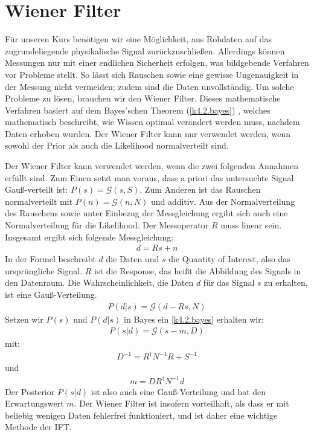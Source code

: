 \section{Wiener Filter}\label{k4.2.wiener.filter}

Für unseren Kurs benötigen wir eine Möglichkeit, aus Rohdaten auf das zugrundeliegende physikalische Signal zurückzuschließen. Allerdings können Messungen nur mit einer endlichen Sicherheit erfolgen, was bildgebende Verfahren vor Probleme stellt. So lässt sich Rauschen sowie eine gewisse Ungenauigkeit in der Messung nicht vermeiden; zudem sind die Daten unvollständig. Um solche Probleme zu lösen, brauchen wir den Wiener Filter.
Dieses mathematische Verfahren basiert auf dem Bayes'schen Theorem
(\ref{k4.2.bayes})
, welches mathematisch beschreibt, wie Wissen optimal verändert werden muss, nachdem Daten erhoben wurden. Der Wiener Filter kann nur verwendet werden, wenn sowohl der Prior als auch die Likelihood normalverteilt sind.

Der Wiener Filter kann verwendet werden, wenn die zwei folgenden Annahmen erfüllt sind. Zum Einen setzt man voraus, dass a priori das untersuchte Signal Gauß-verteilt ist: $P(s) = \mathcal{G}(s,S)$. Zum Anderen ist das Rauschen normalverteilt mit $P(n) = \mathcal{G}(n,N)$ und additiv. Aus der Normalverteilung des Rauschens sowie unter Einbezug der Messgleichung ergibt sich auch eine Normalverteilung für die Likelihood. Der Messoperator $R$ muss linear sein. Insgesamt ergibt sich folgende Messgleichung:
\begin{eqnarray}
d = Rs + n
\end{eqnarray}
In der Formel beschreibt $d$ die Daten und $s$ die Quantity of Interest, also das ursprüngliche Signal. $R$ ist die Response, das heißt die Abbildung des Signals in den Datenraum. Die Wahrscheinlichkeit, die Daten $d$ für das Signal $s$ zu erhalten, ist eine Gauß-Verteilung.
\begin{eqnarray}
P(d|s) = \mathcal{G}(d-Rs,N)
\end{eqnarray}
Setzen wir $P(s)$ und $P(d|s)$ in Bayes ein \cref{k4.2.bayes} erhalten wir:
\begin{eqnarray}
P(s|d) = \mathcal{G}(s-m,D)
\end{eqnarray}
mit:
\begin{eqnarray}
D^{-1} = R^{\dagger} N^{-1}R + S^{-1}
\end{eqnarray}
und
\begin{eqnarray}
m = D R^{\dagger} N^{-1}d
\end{eqnarray}
Der Posterior $P(s|d)$ ist also auch eine Gauß-Verteilung und hat den Erwartungswert $m$. Der Wiener Filter ist insofern vorteilhaft, als dass er mit beliebig wenigen Daten fehlerfrei funktioniert, und ist daher eine wichtige Methode der IFT.
